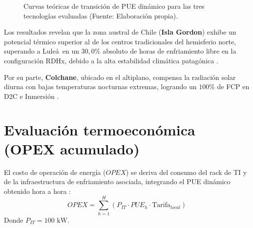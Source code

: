 \begin{figure}[htbp]
\centering
{}
\caption{Curvas te\'oricas de transici\'on de PUE din\'amico para las tres tecnolog\'ias evaluadas (Fuente: Elaboraci\'on propia).}
\label{fig:pue_curves}
\end{figure}

Los resultados revelan que la zona austral de Chile (\textbf{Isla Gordon}) exhibe un potencial t\'ermico superior al de los centros tradicionales del hemisferio norte, superando a Lule\aa\ en un $30,0\%$ absoluto de horas de enfriamiento libre en la configuraci\'on RDHx, debido a la alta estabilidad clim\'atica patag\'onica \cite{masnet2020}. 

Por su parte, \textbf{Colchane}, ubicado en el altiplano, compensa la radiaci\'on solar diurna con bajas temperaturas nocturnas extremas, logrando un $100\%$ de FCP en D2C e Inmersi\'on \cite{bnef2024}.

\section{Evaluaci\'on termoecon\'omica (OPEX acumulado)}
El costo de operaci\'on de energ\'ia ($OPEX$) se deriva del consumo del rack de TI y de la infraestructura de enfriamiento asociada, integrando el PUE din\'amico obtenido hora a hora \cite{greengrid2008}:
\begin{equation}\label{eq:opex_formula}
OPEX = \sum_{h=1}^{H} \left( P_{IT} \cdot PUE_h \cdot \text{Tarifa}_{local} \right)
\end{equation}
Donde $P_{IT} = 100\text{ kW}$.


